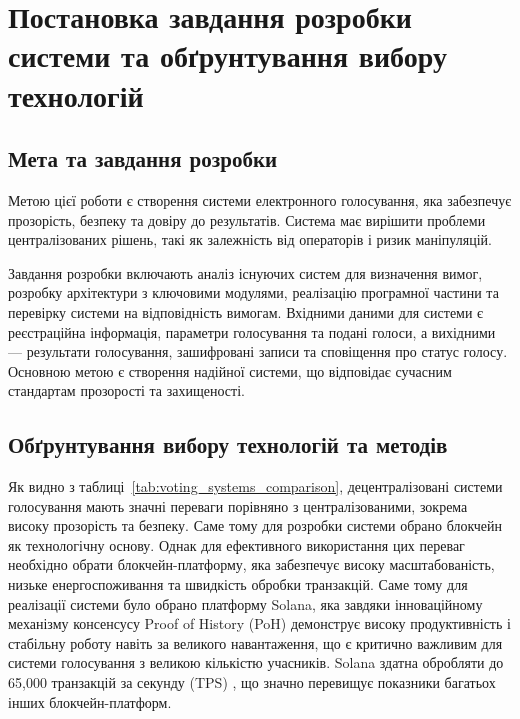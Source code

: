 \documentclass[14pt]{extreport}
\begin{document}
  \chapter{Постановка завдання розробки системи та обґрунтування вибору технологій}

  \section{Мета та завдання розробки}
  
  Метою цієї роботи є створення системи електронного голосування, яка забезпечує прозорість, безпеку та довіру до результатів. Система має вирішити проблеми централізованих рішень, такі як залежність від операторів і ризик маніпуляцій.

  Завдання розробки включають аналіз існуючих систем для визначення вимог, розробку архітектури з ключовими модулями, реалізацію програмної частини та перевірку системи на відповідність вимогам. Вхідними даними для системи є реєстраційна інформація, параметри голосування та подані голоси, а вихідними — результати голосування, зашифровані записи та сповіщення про статус голосу. Основною метою є створення надійної системи, що відповідає сучасним стандартам прозорості та захищеності.
  
  \section{Обґрунтування вибору технологій та методів}
  
  Як видно з таблиці~\ref{tab:voting_systems_comparison}, децентралізовані системи голосування мають значні переваги порівняно з централізованими, зокрема високу прозорість та безпеку. Саме тому для розробки системи обрано блокчейн як технологічну основу. Однак для ефективного використання цих переваг необхідно обрати блокчейн-платформу, яка забезпечує високу масштабованість, низьке енергоспоживання та швидкість обробки транзакцій. Саме тому для реалізації системи було обрано платформу Solana, яка завдяки інноваційному механізму консенсусу Proof of History (PoH) демонструє високу продуктивність і стабільну роботу навіть за великого навантаження, що є критично важливим для системи голосування з великою кількістю учасників. Solana здатна обробляти до 65,000 транзакцій за секунду (TPS) \cite{solana_report}, що значно перевищує показники багатьох інших блокчейн-платформ.
\end{document}
